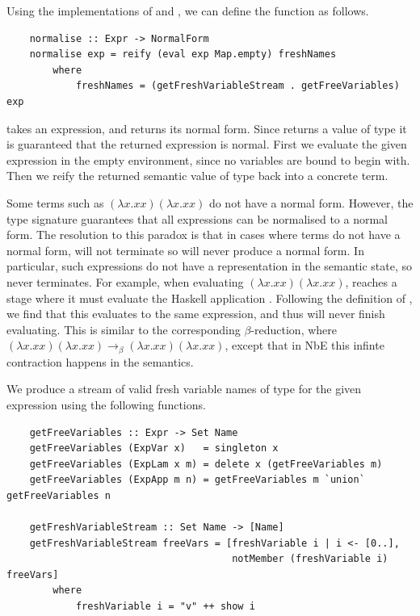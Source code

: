 Using the implementations of  and , we can define the  function as follows.

\begin{lstlisting}
    normalise :: Expr -> NormalForm
    normalise exp = reify (eval exp Map.empty) freshNames
        where
            freshNames = (getFreshVariableStream . getFreeVariables) exp
\end{lstlisting}

 takes an expression, and returns its normal form. Since  returns a value of type  it is guaranteed that the returned expression is normal. First we evaluate the given expression in the empty environment, since no variables are bound to begin with. Then we reify the returned semantic value of type  back into a concrete  term. 

Some terms such as $(\lambda x.x x)(\lambda x.x x)$ do not have a normal form. However, the  type signature guarantees that all expressions can be normalised to a normal form. The resolution to this paradox is that in cases where terms do not have a normal form,  will not terminate so will never produce a normal form. In particular, such expressions do not have a representation in the semantic state, so  never terminates. For example, when evaluating $(\lambda x.x x)(\lambda x.x x)$,  reaches a stage where it must evaluate the Haskell application . Following the definition of , we find that this evaluates to the same expression, and thus will never finish evaluating. This is similar to the corresponding $\beta$-reduction, where $(\lambda x.x x)(\lambda x.x x) \rightarrow_\beta (\lambda x.x x)(\lambda x.x x)$, except that in NbE this infinte contraction happens in the semantics.


We produce a stream of valid fresh variable names  of type \code{[Name]} for the given expression using the following functions.

\begin{lstlisting}
    getFreeVariables :: Expr -> Set Name
    getFreeVariables (ExpVar x)   = singleton x
    getFreeVariables (ExpLam x m) = delete x (getFreeVariables m)
    getFreeVariables (ExpApp m n) = getFreeVariables m `union` getFreeVariables n

    getFreshVariableStream :: Set Name -> [Name]
    getFreshVariableStream freeVars = [freshVariable i | i <- [0..], 
                                       notMember (freshVariable i) freeVars] 
        where
            freshVariable i = "v" ++ show i
\end{lstlisting}

